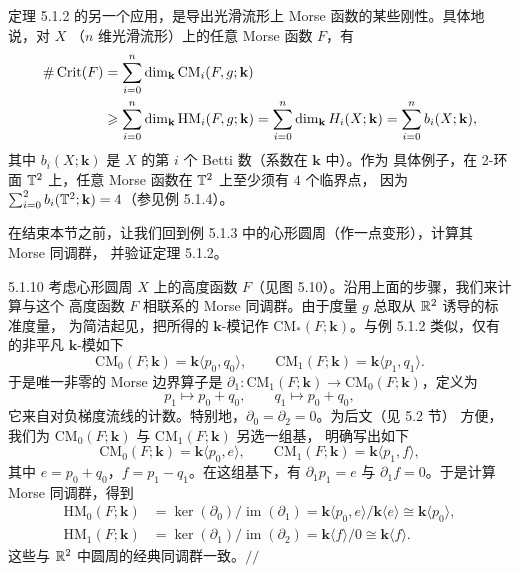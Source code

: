 定理 5.1.2 的另一个应用，是导出光滑流形上 Morse 函数的某些刚性。具体地说，对 $X$
（$n$ 维光滑流形）上的任意 Morse 函数 $F$，有
\begin{align*}
\#\operatorname{Crit}(F)
&=\sum_{i=0}^{n}\dim_{\mathbf k}\mathrm{CM}_i(F,g;\mathbf k)\\
&\geqslant\sum_{i=0}^{n}\dim_{\mathbf k}\mathrm{HM}_i(F,g;\mathbf k)
=\sum_{i=0}^{n}\dim_{\mathbf k}H_i(X;\mathbf k)
=\sum_{i=0}^{n}b_i(X;\mathbf k),
\end{align*}
其中 $b_i(X;\mathbf k)$ 是 $X$ 的第 $i$ 个 Betti 数（系数在 $\mathbf k$ 中）。作为
具体例子，在 2-环面 $\mathbb{T}^2$ 上，任意 Morse 函数在 $\mathbb{T}^2$ 上至少须有 $4$ 个临界点，
因为 $\sum_{i=0}^{2}b_i(\mathbb{T}^2;\mathbf k)=4$（参见例 5.1.4）。


在结束本节之前，让我们回到例 5.1.3 中的心形圆周（作一点变形），计算其 Morse 同调群，
并验证定理 5.1.2。

\begin{wexam}{5.1.10}
考虑心形圆周 $X$ 上的高度函数 $F$（见图 5.10）。沿用上面的步骤，我们来计算与这个
高度函数 $F$ 相联系的 Morse 同调群。由于度量 $g$ 总取从 $\mathbb{R}^2$ 诱导的标准度量，
为简洁起见，把所得的 $\mathbf k$-模记作 $\mathrm{CM}_*(F;\mathbf k)$。与例
5.1.2 类似，仅有的非平凡 $\mathbf k$-模如下
\[
\mathrm{CM}_0(F;\mathbf k)=\mathbf k\langle p_0,q_0\rangle,
\qquad
\mathrm{CM}_1(F;\mathbf k)=\mathbf k\langle p_1,q_1\rangle.
\]
于是唯一非零的 Morse 边界算子是
$\partial_1:\mathrm{CM}_1(F;\mathbf k)\to\mathrm{CM}_0(F;\mathbf k)$，定义为
\[
p_1\mapsto p_0+q_0,\qquad q_1\mapsto p_0+q_0,
\]
它来自对负梯度流线的计数。特别地，$\partial_0=\partial_2=0$。为后文（见 5.2 节）
方便，我们为 $\mathrm{CM}_0(F;\mathbf k)$ 与 $\mathrm{CM}_1(F;\mathbf k)$ 另选一组基，
明确写出如下
\[
\mathrm{CM}_0(F;\mathbf k)=\mathbf k\langle p_0,e\rangle,
\qquad
\mathrm{CM}_1(F;\mathbf k)=\mathbf k\langle p_1,f\rangle,
\]
其中 $e=p_0+q_0$，$f=p_1-q_1$。在这组基下，有
$\partial_1p_1=e$ 与 $\partial_1f=0$。于是计算 Morse 同调群，得到
\begin{equation}\tag{5.10}
\begin{aligned}
\mathrm{HM}_0(F;\mathbf k)
&=\ker(\partial_0)/\operatorname{im}(\partial_1)
=\mathbf k\langle p_0,e\rangle/\mathbf k\langle e\rangle
\cong\mathbf k\langle p_0\rangle,\\
\mathrm{HM}_1(F;\mathbf k)
&=\ker(\partial_1)/\operatorname{im}(\partial_2)
=\mathbf k\langle f\rangle/0\cong\mathbf k\langle f\rangle.
\end{aligned}
\end{equation}
这些与 $\mathbb{R}^2$ 中圆周的经典同调群一致。\hfill$//$
\end{wexam}

